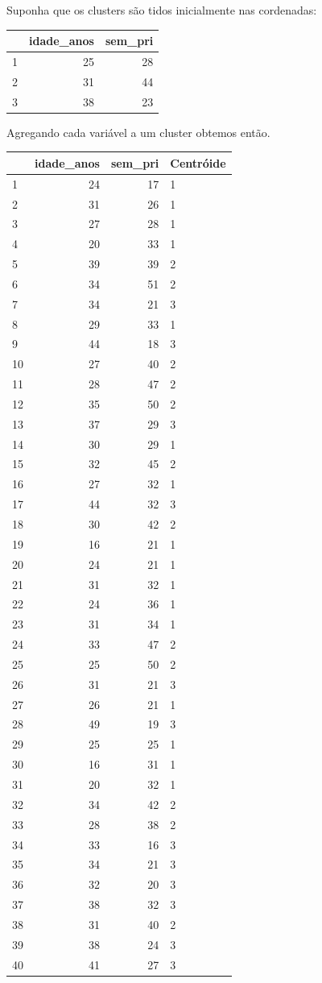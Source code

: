 \documentclass[
  letterpaper,
  DIV=11,
  numbers=noendperiod]{scrreprt}
\begin{document}
Suponha que os clusters são tidos inicialmente nas cordenadas:

\begin{longtable}[]{@{}lrr@{}}
\toprule()
& idade\_anos & sem\_pri \\
\midrule()
\endhead
1 & 25 & 28 \\
2 & 31 & 44 \\
3 & 38 & 23 \\
\bottomrule()
\end{longtable}

Agregando cada variável a um cluster obtemos então.

\begin{longtable}[]{@{}lrrl@{}}
\toprule()
& idade\_anos & sem\_pri & Centróide \\
\midrule()
\endhead
1 & 24 & 17 & 1 \\
2 & 31 & 26 & 1 \\
3 & 27 & 28 & 1 \\
4 & 20 & 33 & 1 \\
5 & 39 & 39 & 2 \\
6 & 34 & 51 & 2 \\
7 & 34 & 21 & 3 \\
8 & 29 & 33 & 1 \\
9 & 44 & 18 & 3 \\
10 & 27 & 40 & 2 \\
11 & 28 & 47 & 2 \\
12 & 35 & 50 & 2 \\
13 & 37 & 29 & 3 \\
14 & 30 & 29 & 1 \\
15 & 32 & 45 & 2 \\
16 & 27 & 32 & 1 \\
17 & 44 & 32 & 3 \\
18 & 30 & 42 & 2 \\
19 & 16 & 21 & 1 \\
20 & 24 & 21 & 1 \\
21 & 31 & 32 & 1 \\
22 & 24 & 36 & 1 \\
23 & 31 & 34 & 1 \\
24 & 33 & 47 & 2 \\
25 & 25 & 50 & 2 \\
26 & 31 & 21 & 3 \\
27 & 26 & 21 & 1 \\
28 & 49 & 19 & 3 \\
29 & 25 & 25 & 1 \\
30 & 16 & 31 & 1 \\
31 & 20 & 32 & 1 \\
32 & 34 & 42 & 2 \\
33 & 28 & 38 & 2 \\
34 & 33 & 16 & 3 \\
35 & 34 & 21 & 3 \\
36 & 32 & 20 & 3 \\
37 & 38 & 32 & 3 \\
38 & 31 & 40 & 2 \\
39 & 38 & 24 & 3 \\
40 & 41 & 27 & 3 \\
\bottomrule()
\end{longtable}
\end{document}
